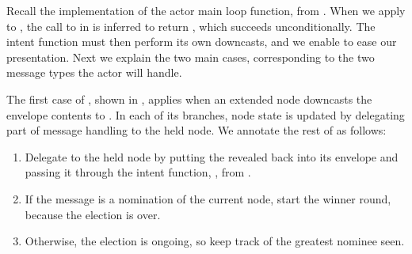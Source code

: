 \documentclass[sigplan,screen]{acmart}
\begin{document}
Recall the implementation of the actor main loop function,
 from .
%
When we apply  to ,
the call to  in 
is inferred to return ,
which succeeds unconditionally.
%
The  intent function must then perform its own downcasts,
and we enable  to ease our presentation.
%
Next we explain the two main cases,
corresponding to the two message types the actor will handle.


The first case of , shown in , applies
when an extended node downcasts the envelope contents to .
%
In each of its branches, node state is updated by delegating part of message
handling to the held node.
%
We annotate the rest of  as follows:
%
\begin{enumerate}[leftmargin=2em]
    \item Delegate to the held node by putting the revealed  back
    into its envelope and passing it through the intent function, ,
    from .
    \item If the message is a nomination of the current node, start
    the winner round, because the election is over.
    \item Otherwise, the election is ongoing, so keep track of the greatest
    nominee seen.
\end{enumerate}
%
\end{document}
